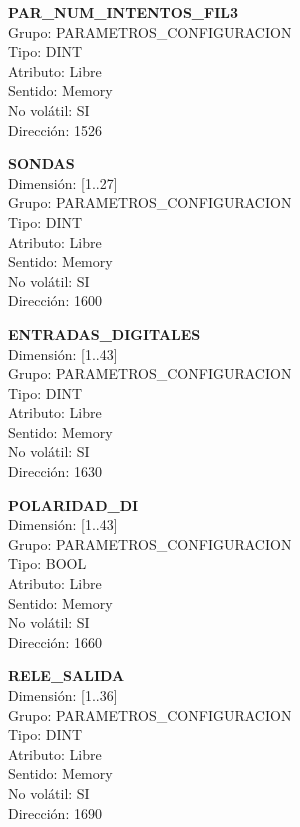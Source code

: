 \vspace{10mm}

\textbf{PAR\_NUM\_INTENTOS\_FIL3}\\Grupo: PARAMETROS\_CONFIGURACION\\Tipo: DINT\\Atributo: Libre\\Sentido: Memory\\No volátil: SI\\Dirección: 1526

\vspace{10mm}

\textbf{SONDAS}\\Dimensión: [1..27]\\Grupo: PARAMETROS\_CONFIGURACION\\Tipo: DINT\\Atributo: Libre\\Sentido: Memory\\No volátil: SI\\Dirección: 1600

\vspace{10mm}

\textbf{ENTRADAS\_DIGITALES}\\Dimensión: [1..43]\\Grupo: PARAMETROS\_CONFIGURACION\\Tipo: DINT\\Atributo: Libre\\Sentido: Memory\\No volátil: SI\\Dirección: 1630

\vspace{10mm}

\textbf{POLARIDAD\_DI}\\Dimensión: [1..43]\\Grupo: PARAMETROS\_CONFIGURACION\\  Tipo: BOOL\\Atributo: Libre\\Sentido: Memory\\No volátil: SI\\Dirección: 1660

\vspace{10mm}

\textbf{RELE\_SALIDA}\\Dimensión: [1..36]\\Grupo: PARAMETROS\_CONFIGURACION\\Tipo: DINT\\Atributo: Libre\\Sentido: Memory\\No volátil: SI\\Dirección: 1690

